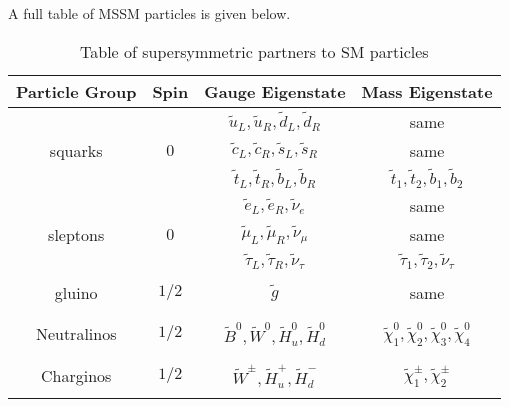 \documentclass[12pt, oneside]{article}   	%
\begin{document}
A full table of MSSM particles is given below.

\begin{table}[H]
\begin{center}
\begin{tabular}{ c c c c }
\toprule
Particle Group	& Spin 	& Gauge Eigenstate 	& Mass Eigenstate \\
\midrule 
\vspace{3mm}
		& 		& $\tilde{u}_{L}, \tilde{u}_{R}, \tilde{d}_{L}, \tilde{d}_{R}$	& same	\\
\vspace{3mm}
squarks 	& $0$	& $\tilde{c}_{L}, \tilde{c}_{R}, \tilde{s}_{L}, \tilde{s}_{R}$	& same	\\
\vspace{3mm}
		& 		& $\tilde{t}_{L}, \tilde{t}_{R}, \tilde{b}_{L}, \tilde{b}_{R}$	& $\tilde{t}_{1}, \tilde{t}_{2}, \tilde{b}_{1}, \tilde{b}_{2}$	\\

\hline 

\vspace{3mm}
		& 		& $\tilde{e}_{L}, \tilde{e}_{R}, \tilde{\nu}_{e}$		& same	\\
\vspace{3mm}
sleptons 	& $0$	& $\tilde{\mu}_{L}, \tilde{\mu}_{R}, \tilde{\nu}_{\mu}$	& same	\\
\vspace{3mm}
		& 		& $\tilde{\tau}_{L}, \tilde{\tau}_{R}, \tilde{\nu}_{\tau}$	& $\tilde{\tau}_{1}, \tilde{\tau}_{2}, \tilde{\nu}_{\tau}$	\\	
		
\hline \\

gluino	& $1/2$	& $\tilde{g}$	&	same \\
\\
\hline \\

Neutralinos	& $1/2$	& $\tilde{B}^{0}, \tilde{W}^{0}, \tilde{H}^{0}_{u}, \tilde{H}^{0}_{d}$& $\tilde{\chi}^{0}_{1}, \tilde{\chi}^{0}_{2}, \tilde{\chi}^{0}_{3}, \tilde{\chi}^{0}_{4}$ \\
\\
\hline \\

Charginos		& $1/2$	& $\tilde{W}^{\pm}, \tilde{H}^{+}_{u}, \tilde{H}^{-}_{d}$& $\tilde{\chi}^{\pm}_{1}, \tilde{\chi}^{\pm}_{2}$ \\
\\
\bottomrule
\end{tabular}
\caption{Table of supersymmetric partners to SM particles}
\label{tab:MSSMParticles}
\end{center}
\end{table}
\end{document}
